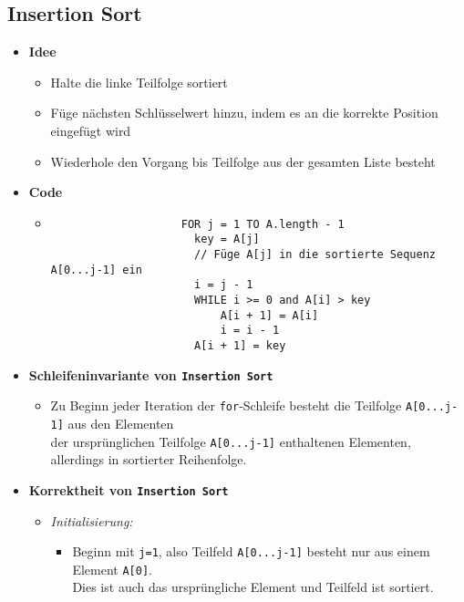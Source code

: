 \subsection{Insertion Sort}
    \begin{itemize}
        \item \textbf{Idee}
            \begin{itemize}
                \item Halte die linke Teilfolge sortiert
                \item Füge nächsten Schlüsselwert hinzu, indem es an die korrekte Position eingefügt wird
                \item Wiederhole den Vorgang bis Teilfolge aus der gesamten Liste besteht
            \end{itemize}
        
        \item \textbf{Code}
            \begin{itemize}
                \item[]
                 \begin{verbatim}  
                    FOR j = 1 TO A.length - 1
                      key = A[j]
                      // Füge A[j] in die sortierte Sequenz A[0...j-1] ein
                      i = j - 1
                      WHILE i >= 0 and A[i] > key
                          A[i + 1] = A[i]
                          i = i - 1
                      A[i + 1] = key
                    \end{verbatim}
            \end{itemize}
            
        \item \textbf{Schleifeninvariante von \texttt{Insertion Sort}} {\label{insSortSiv}} 
            \begin{itemize}
                \item Zu Beginn jeder Iteration der \texttt{for}-Schleife besteht die Teilfolge \texttt{A[0...j-1]} aus den Elementen \\
                der ursprünglichen Teilfolge \texttt{A[0...j-1]} enthaltenen Elementen, allerdings in sortierter Reihenfolge.
            \end{itemize}

        \item \textbf{Korrektheit von \texttt{Insertion Sort}}
            \begin{itemize}
                \item \textit{Initialisierung:}
                    \begin{itemize}
                        \item   Beginn mit \texttt{j=1}, also Teilfeld \texttt{A[0...j-1]} besteht nur aus einem Element \texttt{A[0]}. \\
                                Dies ist auch das ursprüngliche Element und Teilfeld ist sortiert.
                    \end{itemize}


\end{itemize}
\end{itemize}
